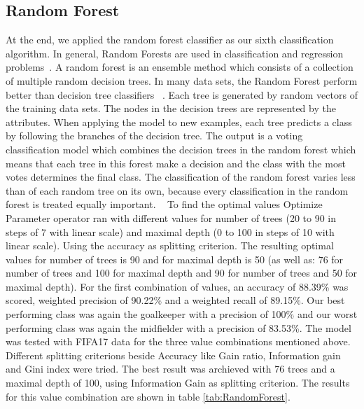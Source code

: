 \subsection{Random Forest}

At the end, we applied the random forest classifier as our sixth classification algorithm. In
general, Random Forests are used in classification and regression problems~\cite{ref_rapidminerRandomForest}.
A random forest is an ensemble method which consists of a collection of
multiple random decision trees. In many data sets, the Random Forest perform better than
decision tree classifiers ~\cite{ref_Tan}. Each tree is generated by random vectors of the training data sets. The nodes in the decision
trees are represented by the attributes. \newline 
When applying the model to new examples, each tree predicts a class by following the branches of the decision tree. The output is a voting
classification model which combines the decision trees in the random forest which means that
each tree in this forest make a decision and the class with the most votes determines the final
class. The classification of the random forest varies less than of each random tree on its own,
because every classification in the random forest is treated equally important. ~\cite{ref_rapidminerRandomForest} \newline
To find the optimal
values Optimize Parameter operator ran with different
values for number of trees (20 to 90 in steps of 7 with linear scale) and maximal depth (0 to
100 in steps of 10 with linear scale). Using the accuracy as splitting criterion. The resulting
optimal values for number of trees is 90 and for maximal depth is 50 (as well as: 76 for
number of trees and 100 for maximal depth and 90 for number of trees and 50 for maximal
depth). For the first combination of values, an accuracy of 88.39\% was scored, weighted precision of
90.22\% and a weighted recall of 89.15\%. Our best performing class was again the goalkeeper with a
precision of 100\% and our worst performing class was again the midfielder with a precision
of 83.53\%. The model was tested with FIFA17 data for the three
value combinations mentioned above. Different splitting criterions beside
Accuracy like Gain ratio, Information gain and Gini index were tried. The best result was archieved with
76 trees and a maximal depth of 100, using Information Gain as splitting criterion. The
results for this value combination are shown in table \ref{tab:RandomForest}.

